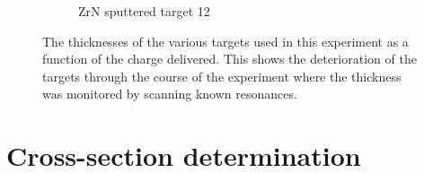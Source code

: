 \begin{figure}
\begin{subfigure}[b]{0.475\textwidth}
            \caption[ZrN sputtered target 12]%
            {{\small ZrN sputtered target 12}}    
            \label{fig: target12}
        \end{subfigure}
        \caption[ The thicknesses of the various targets used in this experiment as a function of the charge delivered. This shows the deterioration of the targets through the course of the experiment where the thickness was monitored by scanning known resonances. ]
        {\small The thicknesses of the various targets used in this experiment as a function of the charge delivered. This shows the deterioration of the targets through the course of the experiment where the thickness was monitored by scanning known resonances. } 
        \label{fig: targetThicknesses}
\end{figure}




\section{Cross-section determination}
\label{sec: cross-section}





%
% 
% 
